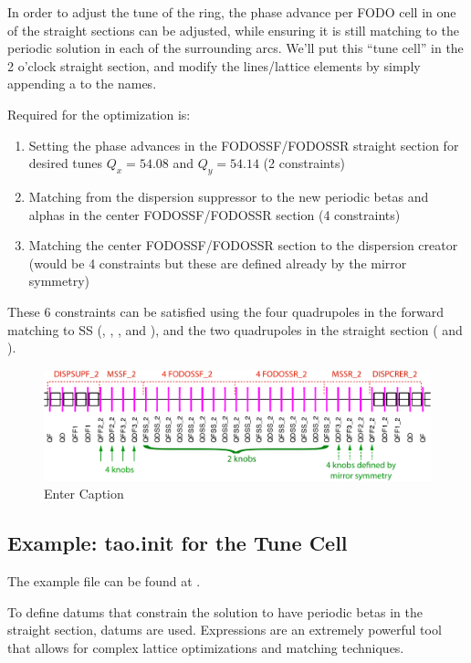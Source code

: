 \documentclass{hitec}     %
\begin{document}
{In order to adjust the tune of the ring, the phase advance per FODO cell in one of the straight sections can be adjusted, while ensuring it is still matching to the periodic solution in each of the surrounding arcs. We'll put this ``tune cell'' in the 2 o'clock straight section, and modify the lines/lattice elements by simply appending a  to the names.

Required for the optimization is:
\begin{enumerate}[leftmargin=*]
    \item Setting the phase advances in the FODOSSF/FODOSSR straight section for desired tunes $Q_x=54.08$ and $Q_y=54.14$ (2 constraints)
    \item Matching from the dispersion suppressor to the new periodic betas and alphas in the center FODOSSF/FODOSSR section (4 constraints)
    \item Matching the center FODOSSF/FODOSSR section to the dispersion creator (would be 4 constraints but these are defined already by the mirror symmetry)
\end{enumerate}

These 6 constraints can be satisfied using the four quadrupoles in the forward matching to SS (, , , and ), and the two quadrupoles in the straight section ( and ). 

\begin{figure}[!h]
    \centering
    \includegraphics[width=1\linewidth]{figures/tunecell.pdf}
    \caption{Enter Caption}
    \label{f:tunecell}
\end{figure}

\subsection{Example: tao.init for the Tune Cell}

The example file can be found at .

To define datums that constrain the solution to have periodic betas in the straight section,
 datums are used. Expressions are an extremely powerful tool that allows for complex lattice optimizations and matching techniques. 

}
\end{document}
